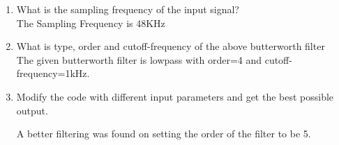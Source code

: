 \documentclass[journal,12pt,twocolumn]{IEEEtran}
\theoremstyle{remark}
\begin{document}
\begin{enumerate}[label=\thesection.\arabic*]
\item What is the sampling frequency of the input signal?\\
\solution The Sampling Frequency is 48KHz
\item
What is type, order and  cutoff-frequency of the above butterworth filter
\\
\solution The given butterworth filter is lowpass with order=4 and cutoff-frequency=1kHz.

\item
Modify the code with different input parameters and get the best possible output.

\solution
A better filtering was found on setting the order of the filter to be 5.


\end{enumerate}
\end{document}
